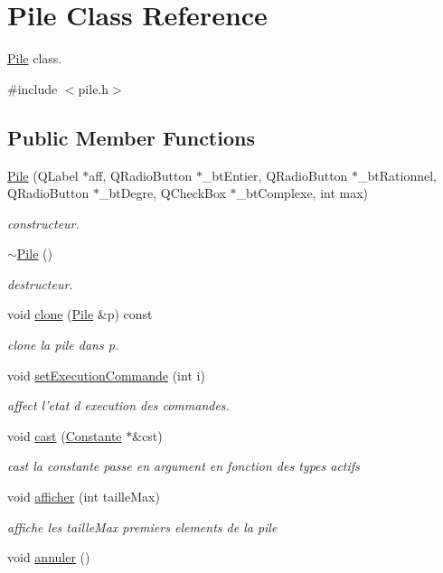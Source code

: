 \hypertarget{class_pile}{\section{Pile Class Reference}
\label{class_pile}
}


\hyperlink{class_pile}{Pile} class.  




{\ttfamily \#include $<$pile.\-h$>$}

\subsection*{Public Member Functions}
\begin{DoxyCompactItemize}
\item 
\hyperlink{class_pile_a0866305f3090d5c21168c2f3758e7f3c}{Pile} (Q\-Label $\ast$aff, Q\-Radio\-Button $\ast$\-\_\-bt\-Entier, Q\-Radio\-Button $\ast$\-\_\-bt\-Rationnel, Q\-Radio\-Button $\ast$\-\_\-bt\-Degre, Q\-Check\-Box $\ast$\-\_\-bt\-Complexe, int max)
\begin{DoxyCompactList}\small\item\em constructeur. \end{DoxyCompactList}\item 
\hyperlink{class_pile_ab2d1398d675586ff34994e2b109df152}{$\sim$\-Pile} ()
\begin{DoxyCompactList}\small\item\em destructeur. \end{DoxyCompactList}\item 
void \hyperlink{class_pile_a98f3ede0ac9e571149357e2658b2f054}{clone} (\hyperlink{class_pile}{Pile} \&p) const 
\begin{DoxyCompactList}\small\item\em clone la pile dans p. \end{DoxyCompactList}\item 
void \hyperlink{class_pile_a0e6c368c10d31660652f39336c77852c}{set\-Execution\-Commande} (int i)
\begin{DoxyCompactList}\small\item\em affect l'etat d execution des commandes. \end{DoxyCompactList}\item 
void \hyperlink{class_pile_a16b10153da0c61ca74a44426d23f9891}{cast} (\hyperlink{class_constante}{Constante} $\ast$\&cst)
\begin{DoxyCompactList}\small\item\em cast la constante passe en argument en fonction des types actifs \end{DoxyCompactList}\item 
void \hyperlink{class_pile_a67ce82a40340646f59e646199771114d}{afficher} (int taille\-Max)
\begin{DoxyCompactList}\small\item\em affiche les taille\-Max premiers elements de la pile \end{DoxyCompactList}\item 
\hypertarget{class_pile_af8efea7a91f6403eab295577004ae620}{void \hyperlink{class_pile_af8efea7a91f6403eab295577004ae620}{annuler} ()}\label{class_pile_af8efea7a91f6403eab295577004ae620}


\end{DoxyCompactItemize}
